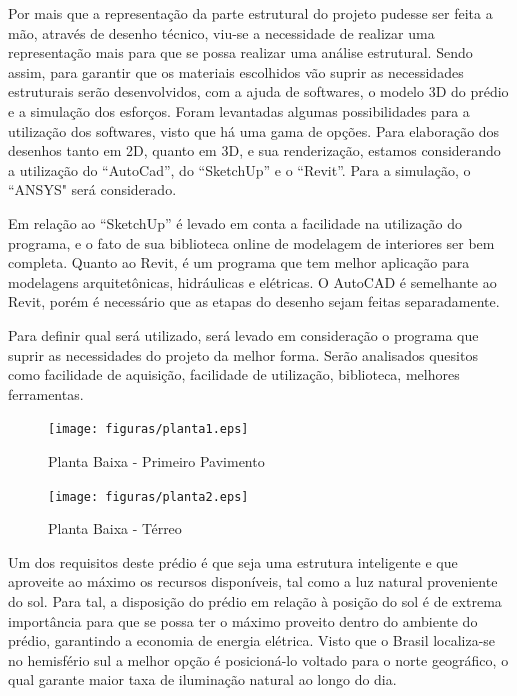 Por mais que a representação da parte estrutural do projeto pudesse ser feita a mão, através de desenho técnico, viu-se a necessidade de realizar uma representação mais para que se possa realizar uma análise estrutural. Sendo assim, para garantir que os materiais escolhidos vão suprir as necessidades estruturais serão desenvolvidos, com a ajuda de softwares, o modelo 3D do prédio e a simulação dos esforços.
Foram levantadas algumas possibilidades para a utilização dos softwares, visto que há uma gama de opções. Para elaboração dos desenhos tanto em 2D, quanto em 3D, e sua renderização, estamos considerando a utilização do “AutoCad”, do “SketchUp” e o “Revit”. Para a simulação, o “ANSYS" será considerado.

Em relação ao “SketchUp” é levado em conta a facilidade na utilização do programa, e o fato de sua biblioteca online de modelagem de interiores ser bem completa. Quanto ao Revit, é um programa que tem melhor aplicação para modelagens arquitetônicas, hidráulicas e elétricas. O AutoCAD é semelhante ao Revit, porém é necessário que as etapas do desenho sejam feitas separadamente.

Para definir qual será utilizado, será levado em consideração o programa que suprir as necessidades do projeto da melhor forma. Serão analisados quesitos como facilidade de aquisição, facilidade de utilização, biblioteca, melhores ferramentas.

 \begin{figure}[!h]
 	\centering	\texttt{[image: figuras/planta1.eps]}
 	\caption{Planta Baixa - Primeiro Pavimento}
 	\label{fig02243}
\end{figure}

 \begin{figure}[!h]
 	\centering
\texttt{[image: figuras/planta2.eps]}
 	\caption{Planta Baixa - Térreo}
 	\label{fig02242}
\end{figure}

\pagebreak

Um dos requisitos deste prédio é que seja uma estrutura inteligente e que aproveite ao máximo os recursos disponíveis, tal como a luz natural proveniente do sol. Para tal, a disposição do prédio em relação à posição do sol é de extrema importância para que se possa ter o máximo proveito dentro do ambiente do prédio, garantindo a economia de energia elétrica. Visto que o Brasil localiza-se no hemisfério sul a melhor opção é posicioná-lo voltado para o norte geográfico, o qual garante maior taxa de iluminação natural ao longo do dia.

